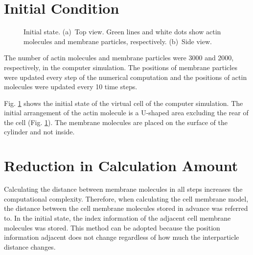 \documentclass[a4paper,12pt, oneside]{book}
\begin{document}
\section{Initial Condition}
\begin{figure}[tbp]
\centering
  \caption{Initial state. (a)~Top view. Green lines and white dots show actin molecules and membrane particles, respectively. (b)~Side view.}
 \label{fig:ini}
\end{figure}
The number of actin molecules and membrane particles were 3000 and 2000, respectively, in the computer simulation.
The positions of membrane particles were updated every step of the numerical computation and the positions of actin molecules were updated every 10 time steps.

Fig. \ref{fig:ini} shows the initial state of the virtual cell of  the computer simulation.
The initial arrangement of the actin molecule is a U-shaped area excluding the rear of the cell (Fig. \ref{fig:ini}).
The membrane molecules are placed on the surface of the cylinder and not inside.

\section{Reduction in Calculation Amount}
Calculating the distance between membrane molecules in all steps increases the computational complexity.
Therefore, when calculating the cell membrane model, the distance between the cell membrane molecules stored in advance was referred to.
In the initial state, the index information of the adjacent cell membrane molecules was stored.
This method can be adopted because the position information adjacent does not change regardless of how much the interparticle distance changes.
\end{document}
